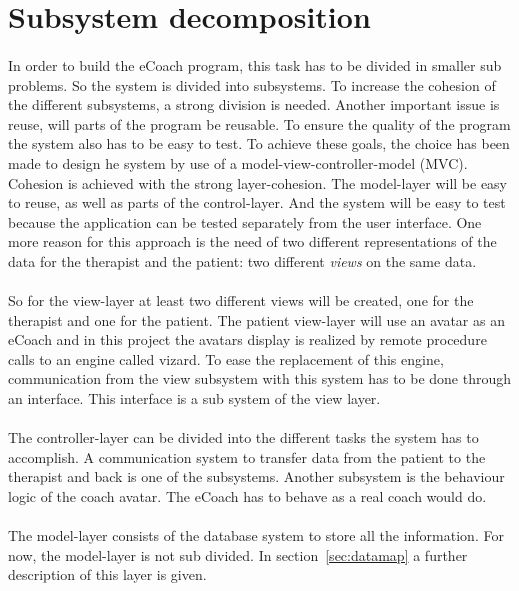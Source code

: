\section{Subsystem decomposition}
\label{sec:subsystem}

\paragraph{}
In order to build the eCoach program, this task has to be divided in smaller sub problems. So the system is divided into subsystems. To increase the cohesion of the different subsystems, a strong division is needed. Another important issue is reuse, will parts of the program be reusable. To ensure the quality of the program the system also has to be easy to test. To achieve these goals, the choice has been made to design he system by use of a \gls{model-view-controller}-model (MVC). Cohesion is achieved  with the strong layer-cohesion. The model-layer will be easy to reuse, as well as parts of the control-layer. And the system will be easy to test because the application can be tested separately from the user interface. One more reason for this approach is the need of two different representations of the data for the therapist and the patient: two different \textit{views} on the same data.
\paragraph{}
So for the view-layer at least two different views will be created, one for the therapist and one for the patient. The patient view-layer will  use an avatar as an eCoach and in this project the avatars display is realized by remote procedure calls to an engine called vizard. To ease the replacement of this engine, communication from the view subsystem with this system has to be done through an interface. This interface is a sub system of the view layer.
\paragraph{}
The controller-layer can be divided into the different tasks the system has to accomplish. A communication system to transfer data from the patient to the therapist and back is one of the subsystems. Another subsystem is the behaviour logic of the coach avatar. The eCoach has to behave as a real coach would do. 
\paragraph{}
The model-layer consists of the database system to store all the information. For now, the model-layer is not sub divided. In section~\ref{sec:datamap} a further description of this layer is given.
